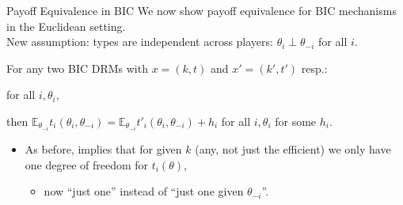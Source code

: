 \documentclass[english,10pt
,aspectratio=169
]{beamer}
\begin{document}
\begin{frame}{Payoff Equivalence in BIC}
	We now show payoff equivalence for BIC mechanisms in the Euclidean setting.
	\\
	New \alert{assumption}: types are independent across players: $\theta_i \perp \theta_{-i}$ for all $i$.
	\begin{theorem}
		For any two BIC DRMs with $x = (k,t)$ and $x' = (k',t')$ resp.:
		
		 for all $i,\theta_i$,
		
		\alert{then $\mathbb{E}_{\theta_{-i}} t_i(\theta_i, \theta_{-i}) = \mathbb{E}_{\theta_{-i}} t'_i(\theta_i, \theta_{-i}) + h_i$} for all $i,\theta_i$ for some $h_i$.
	\end{theorem}
	\begin{itemize}
		\item As before, implies that for given $k$ (any, not just the efficient) we only have one degree of freedom for $t_i(\theta)$,
		\begin{itemize}
			\item now ``just one'' instead of ``just one given $\theta_{-i}$''.
		\end{itemize}
	\end{itemize}
\end{frame}
\end{document}
